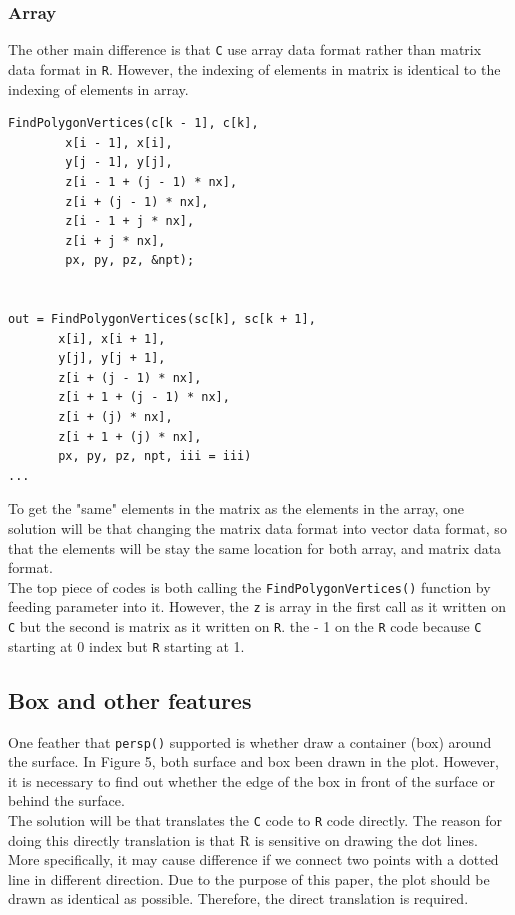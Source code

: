 \documentclass[paper=a4, fontsize=11pt]{report}
\begin{document}
\subsubsection{Array}
The other main difference is that \texttt{C} use array data format rather than matrix data format in \texttt{R}. However, the indexing of elements in matrix is identical to the indexing of elements in array. 
\begin{lstlisting}
FindPolygonVertices(c[k - 1], c[k],
        x[i - 1], x[i],
        y[j - 1], y[j],
        z[i - 1 + (j - 1) * nx],
        z[i + (j - 1) * nx],
        z[i - 1 + j * nx],
        z[i + j * nx],
        px, py, pz, &npt);
	    

out = FindPolygonVertices(sc[k], sc[k + 1],
       x[i], x[i + 1],
       y[j], y[j + 1],
       z[i + (j - 1) * nx],
       z[i + 1 + (j - 1) * nx],
       z[i + (j) * nx],
       z[i + 1 + (j) * nx],
       px, py, pz, npt, iii = iii)
...
\end{lstlisting}

To get the "same" elements in the matrix as the elements in the array, one solution will be that changing the matrix data format into vector data format, so that the elements will be stay the same location for both array, and matrix data format.\\

The top piece of codes is both calling the \texttt{FindPolygonVertices()} function by feeding parameter into it. However, the \texttt{z} is array in the first call as it written on \texttt{C} but the second is matrix as it written on \texttt{R}. the - 1 on the \texttt{R} code because \texttt{C} starting at 0 index but \texttt{R} starting at 1.\\

\subsection{Box and other features}
One feather that \texttt{persp()} supported is whether draw a container (box) around the surface. In Figure 5, both surface and box been drawn in the plot. However, it is necessary to find out whether the edge of the box in front of the surface or behind the surface. \\

The solution will be that translates the \texttt{C} code to \texttt{R} code directly. The reason for doing this directly translation is that R is sensitive on drawing the dot lines. More specifically, it may cause difference if we connect two points with a dotted line in different direction. Due to the purpose of this paper, the plot should be drawn as identical as possible. Therefore, the direct translation is required.\\
\end{document}
